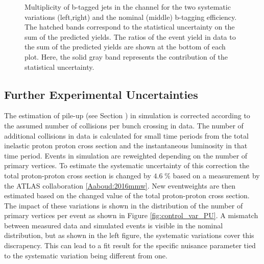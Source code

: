 \begin{figure}[htbp!]
\begin{center}
\caption{Multiplicity of b-tagged jets in the \emu channel for the two systematic variations (left,right) and the nominal (middle) b-tagging efficiency.
The hatched bands correspond to the statistical uncertainty on the sum of the predicted yields. 
        The ratios of the event yield in data to the sum of the predicted yields are
        shown at the bottom of each plot. Here, the solid gray band
        represents the contribution of the statistical uncertainty.
  \label{fig:control_var_BTAGH}}
  \end{center}
\end{figure}


\subsection{Further Experimental Uncertainties}

The estimation of pile-up (see Section ) in simulation is corrected according to the assumed number of collisions per bunch crossing in data. The number of additional collisions
in data is calculated for small time periods from the total inelastic proton proton cross section and the instantaneous luminosity in that time period.  
Events in simulation are reweighted depending on the number of primary vertices. To estimate the systematic uncertainty of this correction the total proton-proton cross section is changed
by $4.6 \; \%$ based on a measurement by the ATLAS collaboration \ref{Aaboud:2016mmw}. New eventweights are then estimated based on the changed value of the total proton-proton cross section.
The impact of these variations is shown in the distribution of the number of primary vertices per event as shown in Figure \ref{fig:control_var_PU}.
A mismatch between measured data and simulated events is visible in the nominal distribution, but as shown in the left figure, the systematic variations cover this discrapency.
This can lead to a fit result for the specific nuisance parameter tied to the systematic variation being different from one.

